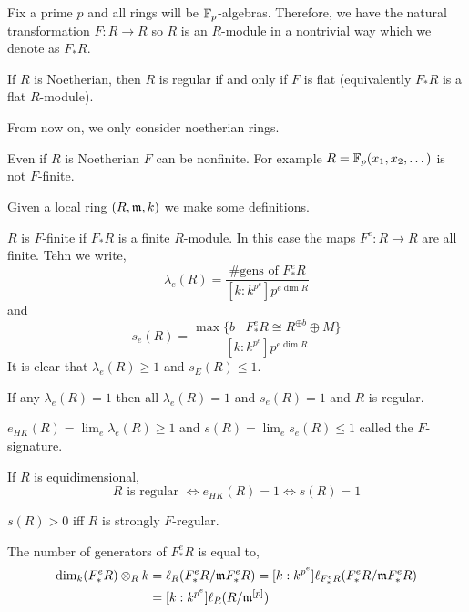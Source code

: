 \documentclass[12pt]{article}
\begin{document}
Fix a prime $p$ and all rings will be $\mathbb{F}_p$-algebras. Therefore, we have the natural transformation $F : R \to R$ so $R$ is an $R$-module in a nontrivial way which we denote as $F_* R$. 

\begin{theorem}[Kunz]
If $R$ is Noetherian, then $R$ is regular if and only if $F$ is flat (equivalently $F_* R$ is a flat $R$-module). 
\end{theorem}

\begin{rmk}
From now on, we only consider noetherian rings. 
\end{rmk}

\begin{rmk}
Even if $R$ is Noetherian $F$ can be nonfinite. For example $R = \mathbb{F}_p(x_1, x_2, \dots)$ is not $F$-finite.
\end{rmk}

Given a local ring $(R, \mathfrak{m}, k)$ we make some definitions.

\begin{defn}
$R$ is $F$-finite if $F_* R$ is a finite $R$-module. In this case the maps $F^e : R \to R$ are all finite. Tehn we write,
\[ \lambda_e(R) = \frac{\# \text{gens of } F^e_* R}{[k : k^{p^e}] p^{e \dim{R}}} \] 
and
\[ s_e(R) = \frac{\max \{ b \mid F_*^e R \cong R^{\oplus b} \oplus M \}}{[k : k^{p^e}] p^{e \dim{R}}} \]
It is clear that $\lambda_e(R) \ge 1$ and $s_E(R) \le 1$.
\end{defn}

\begin{prop}
If any $\lambda_e(R) = 1$ then all $\lambda_e(R) = 1$ and $s_e(R) = 1$ and $R$ is regular.
\end{prop}

\begin{defn}
$e_{HK}(R) = \lim_e \lambda_e(R) \ge 1$ and $s(R) = \lim_e s_e(R) \le 1$ called the $F$-signature.
\end{defn}

\begin{prop}
If $R$ is equidimensional, 
\[ R \text{ is regular } \iff e_{HK}(R) = 1 \iff s(R) = 1 \]
\end{prop}

\begin{prop}
$s(R) > 0$ iff $R$ is strongly $F$-regular.
\end{prop}

\begin{rmk}
The number of generators of $F^e_* R$ is equal to,
\begin{align*}
\dim_{k} (F^e_* R) \otimes_R k & = \ell_{R}(F^e_* R / \mathfrak{m} F^e_* R) = [k : k^{p^e}] \ell_{F^e_* R}(F^e_* R / \mathfrak{m} F^e_* R)
\\
& = [k : k^{p^e}] \ell_R(R/\mathfrak{m}^{[p]}) 
\end{align*}
\end{rmk}
\end{document}
